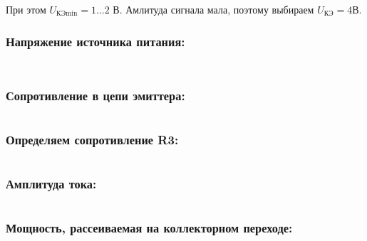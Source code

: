   \begin{equation}
  \label{eq:equation6_4}
   
  \end{equation}   

  При этом $U_{\text{КЭmin}} = 1 \ldots 2$ В.
  Амлитуда сигнала мала, поэтому выбираем $U_{\text{КЭ}} = 4 $В.

  \subsubsection{Напряжение источника питания:}  

  \begin{equation}
  \label{eq:equation6_5}
    
  \end{equation} 

  \begin{equation}
  \label{eq:equation6_6}
    
  \end{equation} 

  \subsubsection{Сопротивление в цепи эмиттера:}  
  
  \begin{equation}
  \label{eq:equation6_7}
    
  \end{equation}

  \subsubsection{Определяем сопротивление R3:} %

  \begin{equation}
  \label{eq:equation6_8}
    
  \end{equation}

  \subsubsection{Амплитуда тока:} %
  
  \begin{equation}
  \label{eq:equation6_9}
   
  \end{equation}
  
  \subsubsection{Мощность, рассеиваемая на коллекторном переходе:} %

